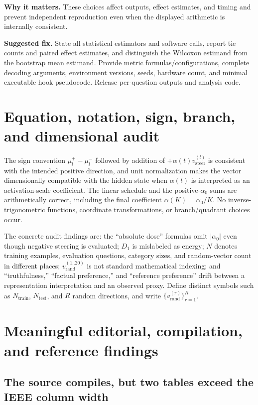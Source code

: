 \documentclass[11pt]{article}
\newcommand{\findinglabel}[1]{\textbf{#1}}
\begin{document}
\findinglabel{Why it matters.} These choices affect outputs, effect estimates, and timing and prevent independent reproduction even when the displayed arithmetic is internally consistent.

\findinglabel{Suggested fix.} State all statistical estimators and software calls, report tie counts and paired effect estimates, and distinguish the Wilcoxon estimand from the bootstrap mean estimand.  Provide metric formulas/configurations, complete decoding arguments, environment versions, seeds, hardware count, and minimal executable hook pseudocode.  Release per-question outputs and analysis code.

\section*{Equation, notation, sign, branch, and dimensional audit}

The sign convention $\mu_l^+-\mu_l^-$ followed by addition of $+\alpha(t)v_{\text{steer}}^{(l)}$ is consistent with the intended positive direction, and unit normalization makes the vector dimensionally compatible with the hidden state when $\alpha(t)$ is interpreted as an activation-scale coefficient.  The linear schedule and the positive-$\alpha_0$ sums are arithmetically correct, including the final coefficient $\alpha(K)=\alpha_0/K$.  No inverse-trigonometric functions, coordinate transformations, or branch/quadrant choices occur.

The concrete audit findings are: the ``absolute dose'' formulas omit $|\alpha_0|$ even though negative steering is evaluated; $D_1$ is mislabeled as energy; $N$ denotes training examples, evaluation questions, category sizes, and random-vector count in different places; $v_{\mathrm{rand}}^{(1..20)}$ is not standard mathematical indexing; and ``truthfulness,'' ``factual preference,'' and ``reference preference'' drift between a representation interpretation and an observed proxy.  Define distinct symbols such as $N_{\mathrm{train}}$, $N_{\mathrm{test}}$, and $R$ random directions, and write $\{v_{\mathrm{rand}}^{(r)}\}_{r=1}^{R}$.

\section*{Meaningful editorial, compilation, and reference findings}

\subsection*{The source compiles, but two tables exceed the IEEE column width}
\end{document}
